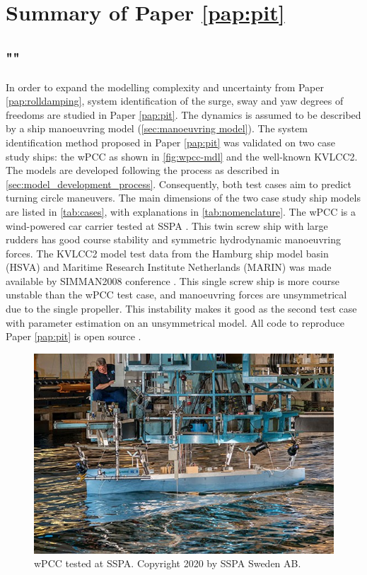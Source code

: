 \section{Summary of Paper \ref{pap:pit}}
\subsection*{""}
In order to expand the modelling complexity and uncertainty from Paper \ref{pap:rolldamping}, system identification of the surge, sway and yaw
degrees of freedoms are studied in Paper \ref{pap:pit}. The dynamics is assumed to be described by a ship manoeuvring model (\autoref{sec:manoeuvring model}). The system identification method proposed in Paper \ref{pap:pit} was validated on two case study ships: the wPCC as shown in \autoref{fig:wpcc-mdl} and the well-known KVLCC2. The models are developed following the process as described in \autoref{sec:model_development_process}. Consequently, both test cases aim to predict turning circle maneuvers. The main dimensions of the two case study ship models are listed in \autoref{tab:cases}, with explanations in \autoref{tab:nomenclature}. The wPCC is a wind-powered car carrier tested at SSPA \cite{alexandersson_wpcc_2022}. This twin screw ship with large rudders has good course stability and symmetric hydrodynamic manoeuvring forces. The KVLCC2 model test data from the Hamburg ship model basin (HSVA) and Maritime Research Institute Netherlands (MARIN) was made available by SIMMAN2008 conference \cite{stern_experience_2011}. This single screw ship is more course unstable than the wPCC test case, and manoeuvring forces are unsymmetrical due to the single propeller. This instability makes it good as the second test case with parameter estimation on an unsymmetrical model. All code to reproduce Paper \ref{pap:pit} is open source \cite{alexandersson_code_2022}.

\begin{figure}[!htb]
\centering
\includegraphics[width=\linewidth]{kappa/images/wpcc_mdl.png}
\caption{wPCC tested at SSPA. Copyright 2020 by SSPA Sweden AB.}
\label{fig:wpcc-mdl}
\end{figure}



